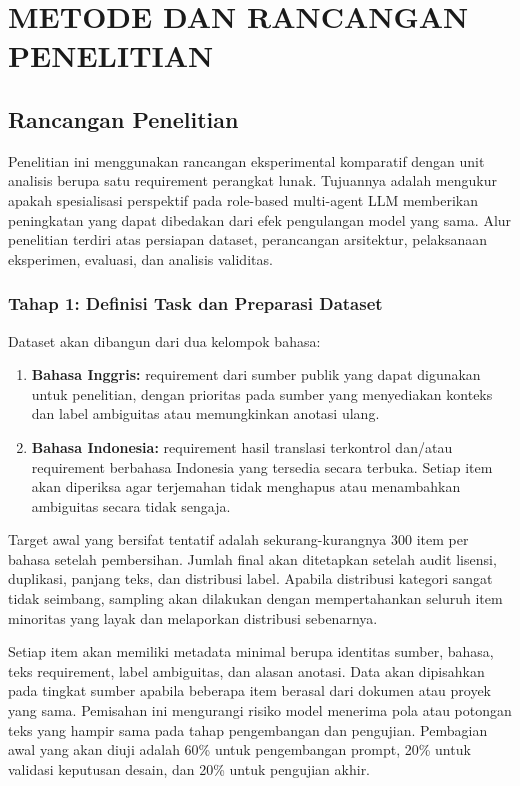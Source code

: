 \chapter{METODE DAN RANCANGAN PENELITIAN}

\section{Rancangan Penelitian}

Penelitian ini menggunakan rancangan eksperimental komparatif dengan unit analisis berupa satu requirement perangkat lunak. Tujuannya adalah mengukur apakah spesialisasi perspektif pada role-based multi-agent LLM memberikan peningkatan yang dapat dibedakan dari efek pengulangan model yang sama. Alur penelitian terdiri atas persiapan dataset, perancangan arsitektur, pelaksanaan eksperimen, evaluasi, dan analisis validitas.

\subsection{Tahap 1: Definisi Task dan Preparasi Dataset}

Dataset akan dibangun dari dua kelompok bahasa:
\begin{enumerate}
\item \textbf{Bahasa Inggris:} requirement dari sumber publik yang dapat digunakan untuk penelitian, dengan prioritas pada sumber yang menyediakan konteks dan label ambiguitas atau memungkinkan anotasi ulang.
\item \textbf{Bahasa Indonesia:} requirement hasil translasi terkontrol dan/atau requirement berbahasa Indonesia yang tersedia secara terbuka. Setiap item akan diperiksa agar terjemahan tidak menghapus atau menambahkan ambiguitas secara tidak sengaja.
\end{enumerate}

Target awal yang bersifat tentatif adalah sekurang-kurangnya 300 item per bahasa setelah pembersihan. Jumlah final akan ditetapkan setelah audit lisensi, duplikasi, panjang teks, dan distribusi label. Apabila distribusi kategori sangat tidak seimbang, sampling akan dilakukan dengan mempertahankan seluruh item minoritas yang layak dan melaporkan distribusi sebenarnya.

Setiap item akan memiliki metadata minimal berupa identitas sumber, bahasa, teks requirement, label ambiguitas, dan alasan anotasi. Data akan dipisahkan pada tingkat sumber apabila beberapa item berasal dari dokumen atau proyek yang sama. Pemisahan ini mengurangi risiko model menerima pola atau potongan teks yang hampir sama pada tahap pengembangan dan pengujian. Pembagian awal yang akan diuji adalah 60\% untuk pengembangan prompt, 20\% untuk validasi keputusan desain, dan 20\% untuk pengujian akhir.

